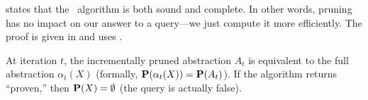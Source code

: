  states that the \PR\ algorithm is both
sound and complete.  In other words, pruning has no impact on our answer to a
query---we just compute it more efficiently.
The proof is given in  and uses .

\begin{theorem}
\label{thm:algorithm}
At iteration $t$,
the incrementally pruned abstraction $A_t$ is equivalent
to the full abstraction $\alpha_t(X)$ (formally, $\mathbf{P}(\alpha_t(X)) = \mathbf{P}(A_t)$).
If the algorithm returns ``proven,'' then $\mathbf{P}(X) = \emptyset$ (the query is actually false).
\end{theorem}
